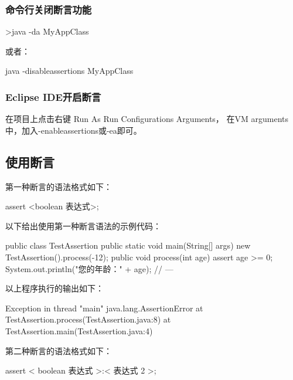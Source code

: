 \subsubsection{命令行关闭断言功能}

\begin{shCode}
>java -da MyAppClass  
\end{shCode}

或者：

\begin{shCode}
java -disableassertions MyAppClass  
\end{shCode}

\subsubsection{Eclipse IDE开启断言}

在项目上点击右键  Run As  Run Configurations  Arguments，
在VM arguments中，加入-enableassertions或-ea即可。

\subsection{使用断言}

第一种断言的语法格式如下：

\begin{javaCode}
assert <boolean 表达式>;  
\end{javaCode}

以下给出使用第一种断言语法的示例代码：


\begin{javaCode}
public class TestAssertion {
  public static void main(String[] args) {
    new TestAssertion().process(-12);
  }
  public void process(int age) {
    assert age >= 0;
    System.out.println("您的年龄：" + age);
    // ---
  }
}
\end{javaCode}

以上程序执行的输出如下：

\begin{stdoutCode}
Exception in thread "main" java.lang.AssertionError
	at TestAssertion.process(TestAssertion.java:8)
	at TestAssertion.main(TestAssertion.java:4)  
\end{stdoutCode}

第二种断言的语法格式如下：

\begin{javaCode}
assert < boolean 表达式 >:< 表达式 2 >;  
\end{javaCode}

